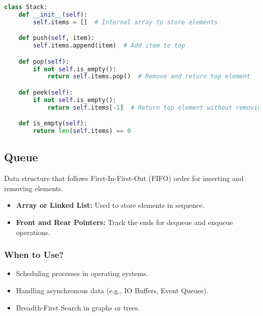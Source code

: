 \begin{algo}
\begin{lstlisting}[language=Python]
class Stack:
    def __init__(self):
        self.items = []  # Internal array to store elements

    def push(self, item):
        self.items.append(item)  # Add item to top

    def pop(self):
        if not self.is_empty():
            return self.items.pop()  # Remove and return top element

    def peek(self):
        if not self.is_empty():
            return self.items[-1]  # Return top element without removing

    def is_empty(self):
        return len(self.items) == 0
\end{lstlisting}
\end{algo}
\newpage

\subsection{Queue}
\begin{summary}
    Data structure that follows First-In-First-Out (FIFO) order for inserting and removing elements.
    \begin{itemize}
        \item \textbf{Array or Linked List:} Used to store elements in sequence.
        \item \textbf{Front and Rear Pointers:} Track the ends for dequeue and enqueue operations.
    \end{itemize}    
\end{summary}

\subsubsection{When to Use?}
\begin{summary}
    \begin{itemize}
        \item Scheduling processes in operating systems.
        \item Handling asynchronous data (e.g., IO Buffers, Event Queues).
        \item Breadth-First Search in graphs or trees.
    \end{itemize}
\end{summary}

